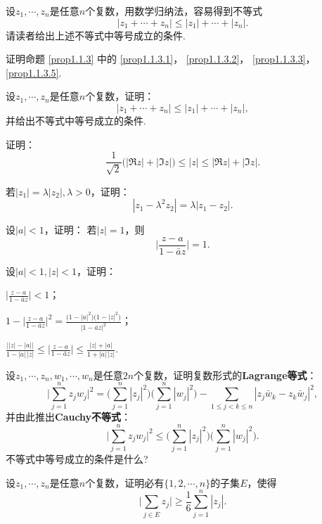 设$z_1,\cdots,z_n$是任意$n$个复数，用数学归纳法，容易得到不等式
\[
  |z_1 + \cdots + z_n| \le |z_1| + \cdots + |z_n|.
\]
请读者给出上述不等式中等号成立的条件.

\begin{xiti}
  \item 证明命题 \ref{prop1.1.3} 中的 \ref{prop1.1.3.1}， \ref{prop1.1.3.2}， \ref{prop1.1.3.3}， \ref{prop1.1.3.5}.
  \item 设$z_1,\cdots,z_n$是任意$n$个复数，证明：
    \[
      |z_1 + \cdots + z_n | \le |z_1| + \cdots + |z_n|,
    \]
    并给出不等式中等号成立的条件.
  \item 证明：
    \[
      \frac1{\sqrt2} \bigl(|\Re z| + |\Im z|\bigr) \le |z| \le |\Re z| + |\Im z|.
    \]
  \item 若$|z_1|=\lambda|z_2|,\lambda>0$，证明：
    \[
      |z_1 - \lambda^2z_2| = \lambda|z_1 - z_2|.
    \]
  \item 设$|a|<1$，证明： 若$|z|=1$，则
    \[
      \bigg| \frac{z-a}{1-\bar az} \bigg| = 1.
    \]
  \item 设$|a|<1,|z|<1$，证明：
    \begin{enuma}
      \item $\bigg|\frac{z-a}{1-\bar az}\bigg|<1$；
      \item $1-\bigg|\frac{z-a}{1-\bar az}\bigg|^2=\frac{\bigl(1-|a|^2\bigr)\bigl(1-|z|^2\bigr)}{|1-\bar az|^2}$；
      \item $\frac{\bigl||z|-|a|\bigr|}{1-|a|\,|z|}\le\bigg|\frac{z-a}{1-\bar az}\bigg|\le
        \frac{|z|+|a|}{1+|a|\,|z|}$.
    \end{enuma}
  \item 设$z_1,\cdots,z_n,w_1,\cdots,w_n$是任意$2n$个复数，证明复数形式的\textbf{Lagrange等式}：
    \[
      \bigg| \sum_{j=1}^n{z_jw_j} \bigg|^2=\bigg( \sum_{j=1}^n{| z_j |^2} \bigg) \bigg( \sum_{j=1}^n{| w_j |^2} \bigg) -\sum_{1\leqslant j<k\leqslant n}{\left| z_j\bar{w}_k-z_k\bar{w}_j \right|^2},
    \]
    并由此推出\textbf{Cauchy不等式}：
    \[
      \bigg| \sum_{j=1}^n{z_jw_j} \bigg|^2\leqslant \bigg( \sum_{j=1}^n{| z_j |^2} \bigg) \bigg( \sum_{j=1}^n{| w_j |^2} \bigg).
    \]
    不等式中等号成立的条件是什么?
  \item 设$z_1,\cdots,z_n$是任意$n$个复数，证明必有$\{1,2,\cdots,n\}$的子集$E$，使得
    \[
      \bigg| \sum_{j\in E}{z_j} \bigg|\geqslant \frac{1}{6}\sum_{j=1}^n{\left| z_j \right|}.
    \]

\end{xiti}

